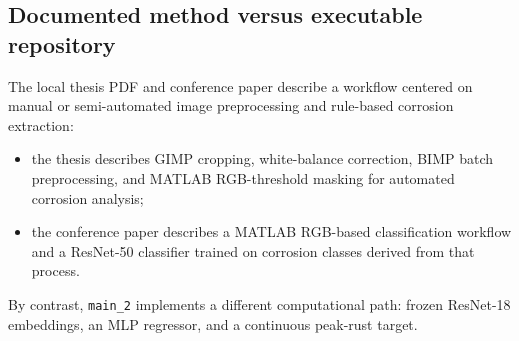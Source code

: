 \documentclass[11pt]{article}
\begin{document}
\subsection{Documented method versus executable repository}
The local thesis PDF and conference paper describe a workflow centered on manual or semi-automated image preprocessing and rule-based corrosion extraction:
\begin{itemize}
  \item the thesis describes GIMP cropping, white-balance correction, BIMP batch preprocessing, and MATLAB RGB-threshold masking for automated corrosion analysis;
  \item the conference paper describes a MATLAB RGB-based classification workflow and a ResNet-50 classifier trained on corrosion classes derived from that process.
\end{itemize}

By contrast, \texttt{main\_2} implements a different computational path: frozen ResNet-18 embeddings, an MLP regressor, and a continuous peak-rust target.
\end{document}
